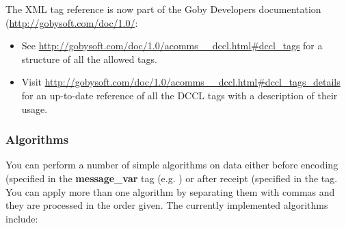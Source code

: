 The XML tag reference is now part of the Goby Developers documentation (\url{http://gobysoft.com/doc/1.0/}:
\begin{itemize}
\item See \url{http://gobysoft.com/doc/1.0/acomms__dccl.html#dccl_tags} for a structure of all the allowed tags.
\item Visit \url{http://gobysoft.com/doc/1.0/acomms__dccl.html#dccl_tags_details} for an up-to-date reference of all the DCCL tags with a description of their usage.
\end{itemize}  

\subsubsection{Algorithms}
You can perform a number of simple algorithms on data either before encoding (specified in the \textbf{message\_var} tag (e.g. ) or after receipt (specified in the  tag. You can apply more than one algorithm by separating them with commas and they are processed in the order given. The currently implemented algorithms include:

